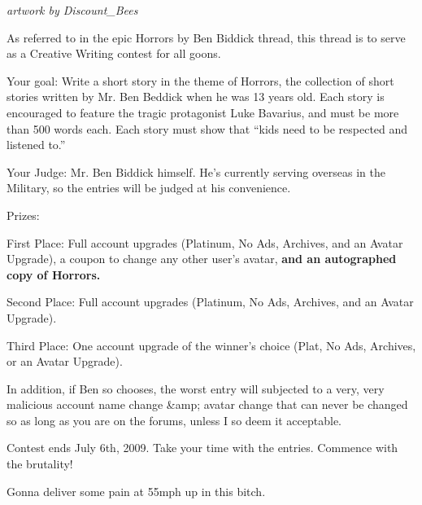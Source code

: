 



{\em artwork by Discount_Bees}



As referred to in the epic Horrors by Ben Biddick thread,
this thread is to serve as a Creative Writing contest for all
goons.



Your goal: Write a short story in the theme of Horrors, the
collection of short stories written by Mr. Ben Beddick when he was
13 years old. Each story is encouraged to feature the tragic
protagonist Luke Bavarius, and must be more than 500 words each.
Each story must show that ``kids need to be respected and listened
to.''



Your Judge: Mr. Ben Biddick himself. He's
currently serving overseas in the Military, so the entries will be
judged at his convenience.



Prizes:

First Place: Full account upgrades (Platinum, No Ads, Archives, and
an Avatar Upgrade), a coupon to change any other user's avatar,
{\bf and an autographed copy of Horrors.}



Second Place: Full account upgrades (Platinum, No Ads, Archives,
and an Avatar Upgrade).



Third Place: One account upgrade of the winner's choice (Plat, No
Ads, Archives, or an Avatar Upgrade).



In addition, if Ben so chooses, the worst entry will subjected to a
very, very malicious account name change &amp; avatar change that
can never be changed so as long as you are on the forums, unless I
so deem it acceptable.



Contest ends July 6th, 2009. Take your time with the entries.
Commence with the brutality! 
 





Gonna deliver some pain at 55mph up in this bitch. 

 





